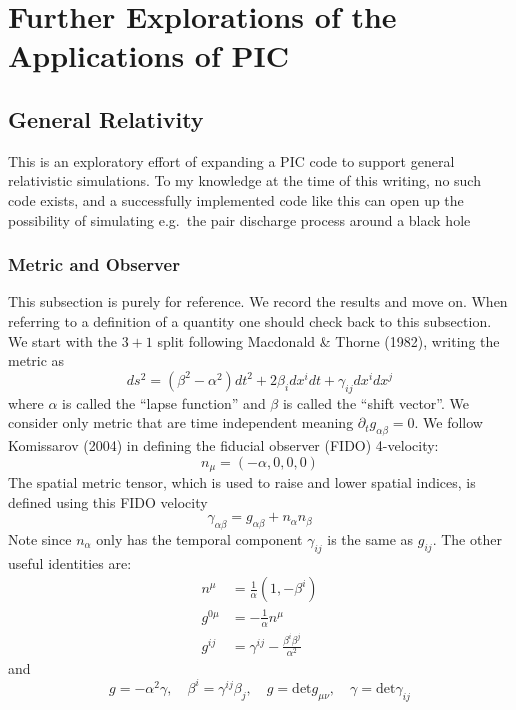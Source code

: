 
\chapter{Further Explorations of the Applications of PIC}
\label{chap:explorations}

\section{General Relativity}
\label{sec:general-relativity}

This is an exploratory effort of expanding a PIC code to support general
relativistic simulations. To my knowledge at the time of this writing, no such
code exists, and a successfully implemented code like this can open up the
possibility of simulating e.g.\ the pair discharge process around a black hole

\subsection{Metric and Observer}
\label{sec:metric}

This subsection is purely for reference. We record the results and move on. When
referring to a definition of a quantity one should check back to this subsection.
We start with the $3+1$ split following Macdonald \& Thorne (1982), writing the
metric as
\begin{equation}
  \label{eq:2}
  ds^2 = (\beta^2 - \alpha^2)dt^2 + 2\beta_idx^idt + \gamma_{ij}dx^idx^j
\end{equation}
where $\alpha$ is called the ``lapse function'' and $\beta$ is called the
``shift vector''. We consider only metric that are time independent meaning
$\partial_tg_{\alpha\beta} = 0$. We follow Komissarov (2004) in defining the
fiducial observer (FIDO) 4-velocity:
\begin{equation}
  \label{eq:4}
  n_{\mu} = (-\alpha, 0, 0, 0)
\end{equation}
The spatial metric tensor, which is used to raise and lower spatial indices, is
defined using this FIDO velocity
\begin{equation}
  \label{eq:1}
  \gamma_{\alpha\beta} = g_{\alpha\beta} + n_{\alpha}n_{\beta}
\end{equation}
Note since $n_{\alpha}$ only has the temporal component $\gamma_{ij}$ is the
same as $g_{ij}$. The other useful identities are:
\begin{align}
\label{eq:3}
n^{\mu} &= \frac{1}{\alpha}(1, -\beta^i) \\
g^{0\mu} &= -\frac{1}{\alpha}n^{\mu} \\
g^{ij} &= \gamma^{ij} - \frac{\beta^i\beta^j}{\alpha^2}
\end{align}
and
\begin{equation}
  \label{eq:5}
  g = -\alpha^{2}\gamma, \quad \beta^i = \gamma^{ij}\beta_{j}, \quad g = \mathrm{det} g_{\mu\nu}, \quad \gamma = \mathrm{det}\gamma_{ij}
\end{equation}

